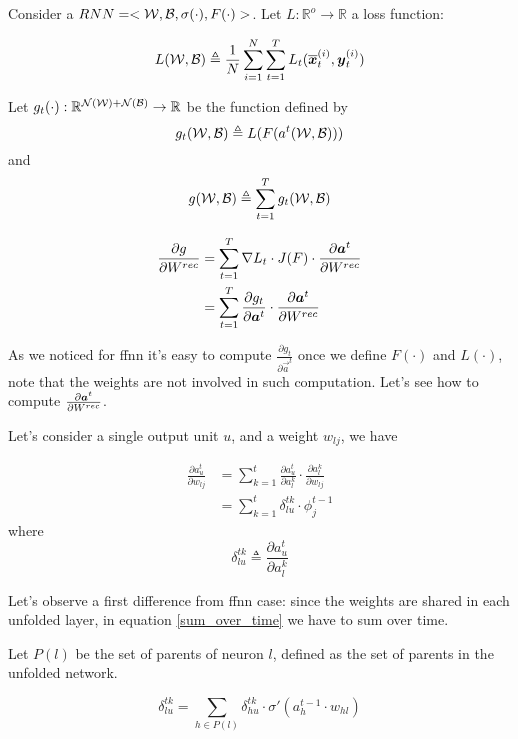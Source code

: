 Consider a $RNN=<\mathcal{W},\mathcal{B},\sigma(\cdot),F(\cdot)>$. Let $L:\mathbb{R}^o \rightarrow \mathbb{R}$ a loss function:

$$L(\mathcal{W},\mathcal{B})\triangleq\frac{1}{N}\sum_{i=1}^N \sum_{t=1}^T L_t(\overline{\boldsymbol{x}}_t^{(i)},\boldsymbol{y}_t^{(i)}) $$

Let $g_t(\cdot):\mathbb{R}^{\mathcal{N}(\mathcal{W})+\mathcal{N}(\mathcal{B})} \rightarrow \mathbb{R}$ be the function defined by
$$g_t(\mathcal{W},\mathcal{B}) \triangleq L(F(a^t(\mathcal{W},\mathcal{B})))$$
and $$g(\mathcal{W},\mathcal{B}) \triangleq \sum_{t=1}^T g_t(\mathcal{W},\mathcal{B})$$



\begin{align}
\frac{\partial g}{\partial W^{rec}} &= \sum_{t=1}^T \nabla L_t \cdot J(F) \cdot \frac{\partial \boldsymbol{a}^t}{\partial W^{rec}}\\
&= \sum_{t=1}^T\frac{\partial g_t}{\partial \boldsymbol{a}^t} \cdot \frac{\partial \boldsymbol{a}^t}{\partial W^{rec}}
\end{align}

As we noticed for ffnn it's easy to compute $\frac{\partial g_t}{\partial \vec{a}^t}$ once we define $F(\cdot)$ and $L(\cdot)$, note that the weights are not involved in such computation.
Let's see how to compute $\frac{\partial \boldsymbol{a}^t}{\partial W^{rec}}$.

Let's consider a single output unit $u$, and a weight $w_{lj}$, we have

\begin{align}
 \label{sum_over_time}
 \frac{\partial a^t_u}{\partial w_{lj}} &= \sum_{k=1}^t \frac{\partial a_u^t}{\partial a^k_l} \cdot \frac{\partial a^k_l}{\partial w_{lj}}\\
 &= \sum_{k=1}^t \delta^{tk}_{lu} \cdot \phi_j^{t-1}
\end{align}
where
\begin{equation}
\delta_{lu}^{tk} \triangleq \frac{\partial a_u^t}{\partial a^k_l}
\end{equation}

Let's observe a first difference from ffnn case: since the weights are shared in each unfolded layer, in equation \ref{sum_over_time} we have to sum over time.

Let $P(l)$ be the set of parents of neuron $l$, defined as the set of parents in the unfolded network.

\begin{equation}
 \delta_{lu}^{tk} = \sum_{h\in P(l)} \delta_{hu}^{tk} \cdot \sigma'(a_h^{t-1}\cdot w_{hl})
\end{equation}

